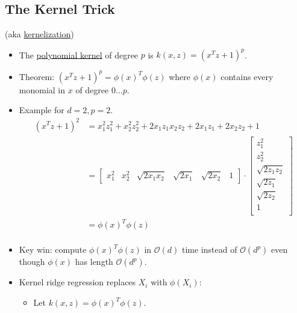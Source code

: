 \documentclass[10pt]{article}
\begin{document}
	\subsection*{The Kernel Trick} (aka \underline{kernelization})
	\
	\begin{itemize}
		\item The \underline{polynomial kernel} of degree $p$ is $k(x,z) = (x^{T}z + 1)^{p}$.
		\item Theorem: $(x^{T}z + 1)^{p} = \phi(x)^{T}\phi(z)$ where $\phi(x)$ contains every monomial in $x$ of degree $0 \dots p$.
		\item Example for $d=2, p=2$.
			\begin{align*}
				(x^{T}z+1)^{2} &= x_{1}^{2}z_{1}^{2} + x_{2}^{2}z_{2}^{2} + 2x_{1}z_{1}x_{2}z_{2} + 2x_{1}z_{1} + 2x_{2}z_{2} + 1\\
					& = \begin{bmatrix}
						x_{1}^{2} & x_{2}^{2} & \sqrt{2x_{1}x_{2}} & \sqrt{2x_{1}} & \sqrt{2x_{2}} & 1
					\end{bmatrix}
					\cdot
					\begin{bmatrix}
						z_{1}^{2}\\
						z_{2}^{2}\\
						\sqrt{2z_{1}z_{2}}\\
						\sqrt{2z_{1}}\\
						\sqrt{2z_{2}}\\
						1\\
					\end{bmatrix}\\
					&= \phi(x)^{T} \phi(z)\\
			\end{align*}
		\item Key win: compute $\phi(x)^{T} \phi(z)$ in $\mathcal{O}(d)$ time instead of $\mathcal{O}(d^{p})$ even though $\phi(x)$ has length $\mathcal{O}(d^{p})$.
		\item Kernel ridge regression replaces $X_{i}$ with $\phi(X_{i})$:
			\begin{itemize}
				\item Let $k(x, z) = \phi(x)^{T}\phi(z)$.	
			\end{itemize} 
	\end{itemize}
\end{document}
